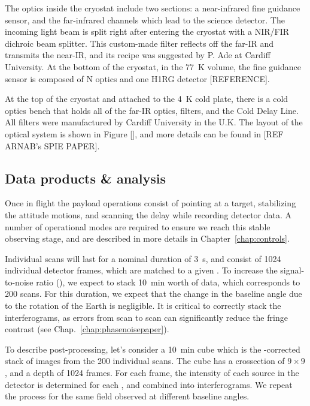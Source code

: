 The optics inside the cryostat include two sections: a near-infrared fine guidance sensor, and the far-infrared channels which lead to the science detector. The incoming light beam is split right after entering the cryostat with a NIR/FIR dichroic beam splitter. This custom-made filter reflects off the far-IR and transmits the near-IR, and its recipe was suggested by P. Ade at Cardiff University. At the bottom of the cryostat, in the \SI{77}{\kelvin} volume, the fine guidance sensor is composed of N optics and one H1RG detector [REFERENCE]. 

At the top of the cryostat and attached to the \SI{4}{\kelvin} cold plate, there is a cold optics bench that holds all of the far-IR optics, filters, and the Cold Delay Line. All filters were manufactured by Cardiff University in the U.K. The layout of the optical system is shown in Figure [], and more details can be found in [REF ARNAB's SPIE PAPER].



\subsection{Data products \& analysis}


Once in flight the payload operations consist of pointing at a target, stabilizing the attitude motions, and scanning the delay while recording detector data. A number of operational modes are required to ensure we reach this stable observing stage, and are described in more details in Chapter~\ref{chap:controls}. 

Individual scans will last for a nominal duration of \SI{3}{\second}, and consist of \si{1024} individual detector frames, which are matched to a given \OPD. To increase the signal-to-noise ratio (\SNR), we expect to stack \SI{10}{\minute} worth of data, which corresponds to 200 scans. For this duration, we expect that the change in the baseline angle due to the rotation of the Earth is negligible. It is critical to correctly stack the interferograms, as \OPD errors from scan to scan can significantly reduce the fringe contrast (see Chap.~\ref{chap:phasenoisepaper}).

To describe post-processing, let's consider a \SI{10}{\minute} cube which is the {\OPD}-corrected stack of images from the 200 individual scans. The cube has a crossection of $9\times 9$, and a depth of 1024 frames. For each frame, the intensity of each source in the detector is determined for each \OPD, and combined into interferograms. We repeat the process for the same field observed at different baseline angles. 

